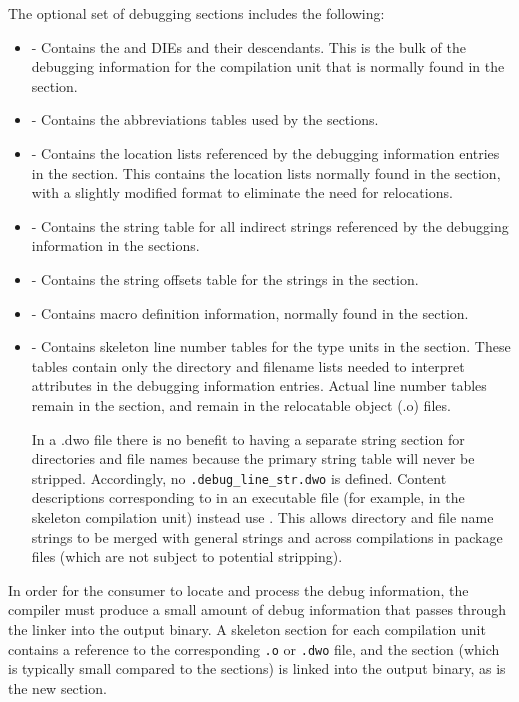 The optional set of debugging sections includes the following:
\begin{itemize}
\item
\dotdebuginfodwo{} - Contains the \DWTAGcompileunit{} and
\DWTAGtypeunit{} DIEs and
their descendants. This is the bulk of the debugging
information for the compilation unit that is normally found
in the \dotdebuginfo{} section.
\item
\dotdebugabbrevdwo{} - Contains the abbreviations tables used by
the \dotdebuginfodwo{} sections.
\item
\dotdebuglocdwo{} - Contains the location lists referenced by
the debugging information entries in the \dotdebuginfodwo{}
section. This contains the location lists normally found in 
the \dotdebugloc{} section,
with a slightly modified format to eliminate the need for
relocations.
\item
\dotdebugstrdwo{} - Contains the string table for all indirect
strings referenced by the debugging information in the
\dotdebuginfodwo{} sections.
\item
\dotdebugstroffsetsdwo{} - Contains the string offsets table
for the strings in the \dotdebugstrdwo{}{} section.
\item
\dotdebugmacrodwo{} - Contains macro definition information,
normally found in the \dotdebugmacro{} section.
\item
\dotdebuglinedwo{} - Contains skeleton line number tables for the type
units in the \dotdebuginfodwo{} section. These tables
contain only the directory and filename lists needed to
interpret \DWATdeclfile{} attributes in the debugging
information entries. Actual line number tables remain in the
\dotdebugline{} section, and remain in the relocatable object
(.o) files.

In a .dwo file there is no benefit to having a separate string
section for directories and file names because the primary
string table will never be stripped. Accordingly, no
\texttt{.debug\_line\_str.dwo} is defined. Content descriptions corresponding
to \DWFORMlinestrp{} in an executable file (for example, in the
skeleton compilation unit) instead use \DWFORMstrx. This allows
directory and file name strings to be merged with general
strings and across compilations in package files (which are not
subject to potential stripping).

\end{itemize}

In order for the consumer to locate and process the debug
information, the compiler must produce a small amount of debug
information that passes through the linker into the output
binary. A skeleton \dotdebuginfo{} section for each compilation unit
contains a reference to the corresponding \texttt{.o} or \texttt{.dwo}
file, and the \dotdebugline{} section (which is typically small
compared to the \dotdebuginfo{} sections) is
linked into the output binary, as is the new \dotdebugaddr{}
section.

